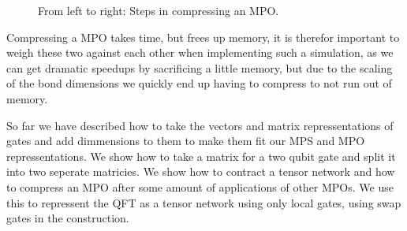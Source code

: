 \begin{figure}[H]
{
    }
    \caption{From left to right: Steps in compressing an MPO.}
    \label{fig:compress}
\end{figure}
\noindent 
Compressing a MPO takes time, but frees up memory, it is therefor important to weigh these two against each other when implementing such a simulation, as we can get dramatic speedups by sacrificing a little memory, but due to the scaling of the bond dimensions we quickly end up having to compress to not run out of memory. 

\vspace{\baselineskip}
\noindent
So far we have described how to take the vectors and matrix repressentations of gates and add dimmensions to them to make them fit our MPS and MPO repressentations. 
We show how to take a matrix for a two qubit gate and split it into two seperate matricies. 
We show how to contract a tensor network and how to compress an MPO after some amount of applications of other MPOs. 
We use this to repressent the QFT as a tensor network using only local gates, using swap gates in the construction.

